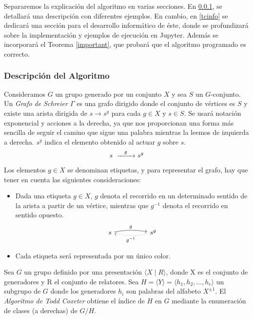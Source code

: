 Separaremos la explicación del algoritmo en varias secciones. En \ref{descripcion}, se detallará una descripción con diferentes ejemplos. En cambio, en \ref{tcinfo} se dedicará una sección para el desarrollo informático de éste, donde se profundizará sobre la implementación y ejemplos de ejecución en Jupyter. Además se incorporará el Teorema \ref{important}, que probará que el algoritmo programado es correcto.




\subsubsection{Descripción del Algoritmo} \label{descripcion}

Consideramos $G$ un grupo generado por un conjunto $X$ y sea $S$ un $G$-conjunto. Un \textit{Grafo de Schreier $\Gamma$} es una grafo dirigido donde el conjunto de vértices es $S$ y existe una arista dirigida de $s \rightarrow s^g$ para cada $g\in X$ y $s \in S$. Se usará notación exponencial y acciones a la derecha, ya que nos proporcionan una forma más sencilla de seguir el camino que sigue una palabra mientras la leemos de izquierda a derecha. $s^g$ indica el elemento obtenido al actuar $g$ sobre $s$.
\[
    s \  \xrightarrow[]{\hspace{0.3cm} g \hspace{0.3cm}}  s^g
\]

Los elementos $g \in X$ se denominan etiquetas, y para representar el grafo, hay que tener en cuenta las siguientes consideraciones: 
\begin{itemize}

    \item  Dada una etiqueta $g \in X$, $g$ denota el recorrido en un determinado sentido de la arista a partir de un vértice, mientras que $g^{-1}$ denota el recorrido en sentido opuesto.
    \[
    \begin{tikzcd}
     s \arrow[rr, bend left=10]{}{g} & & s^g \arrow[ll,dotted, bend left=10]{}{g^{-1}}
    \end{tikzcd}
    \]
    \item Cada etiqueta será representada por un único color. 
\end{itemize}



Sea $G$ un grupo definido por una presentación $\langle X \mid R \rangle$, donde X es el conjunto de generadores y R  el conjunto de relatores. Sea $H= \langle Y \rangle = \langle h_1, h_2, \ldots, h_r \rangle $ un subgrupo de $G$ donde los generadores $h_i$ son palabras del alfabeto $X^{\pm 1}$. 
El \textit{Algoritmo de Todd Coxeter} obtiene el índice de $H$ en $G$ mediante la enumeración de clases (a derechas) de $G/H$. 

